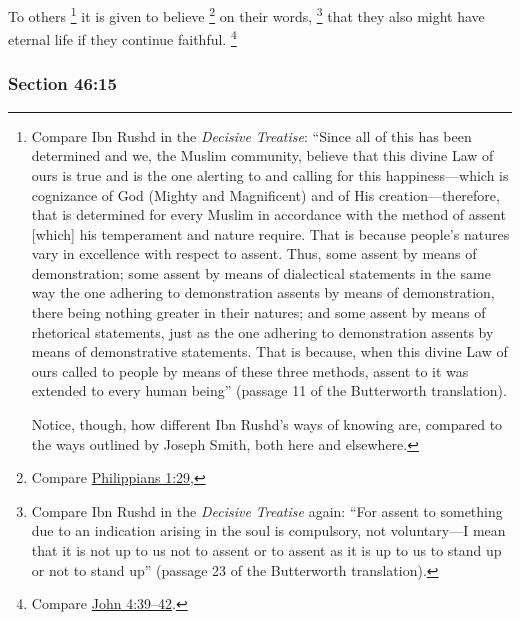 		To others%
			\footnote{%
				Compare Ibn Rushd in the \textit{Decisive Treatise}: ``Since all of this has been determined and we, the Muslim community, believe that this divine Law of ours is true and is the one alerting to and calling for this happiness---which is cognizance of God (Mighty and Magnificent) and of His creation---therefore, that is determined for every Muslim in accordance with the method of assent [which] his temperament and nature require. That is because people's natures vary in excellence with respect to assent. Thus, some assent by means of demonstration; some assent by means of dialectical statements in the same way the one adhering to demonstration assents by means of demonstration, there being nothing greater in their natures; and some assent by means of rhetorical statements, just as the one adhering to demonstration assents by means of demonstrative statements. That is because, when this divine Law of ours called to people by means of these three methods, assent to it was extended to every human being'' (passage 11 of the Butterworth translation).
				
				Notice, though, how different Ibn Rushd's ways of knowing are, compared to the ways outlined by Joseph Smith, both here and elsewhere.
				} 
		it is given to believe%
		\footnote{%
			Compare \hyperref[PHILIPPIANS-1-29]{Philippians 1:29},
			}
		on their words,%
			\footnote{%
				Compare Ibn Rushd in the \textit{Decisive Treatise} again: ``For assent to something due to an indication arising in the soul is compulsory, not voluntary---I mean that it is not up to us not to assent or to assent as it is up to us to stand up or not to stand up'' (passage 23 of the Butterworth translation).
				}
		that they also might have eternal life if they continue faithful.%
			\footnote{%
				Compare \hyperref[JOHN-4-39]{John 4:39--42}.
				}


	\subsubsection{Section 46:15} %
		\label{DC46-15}

